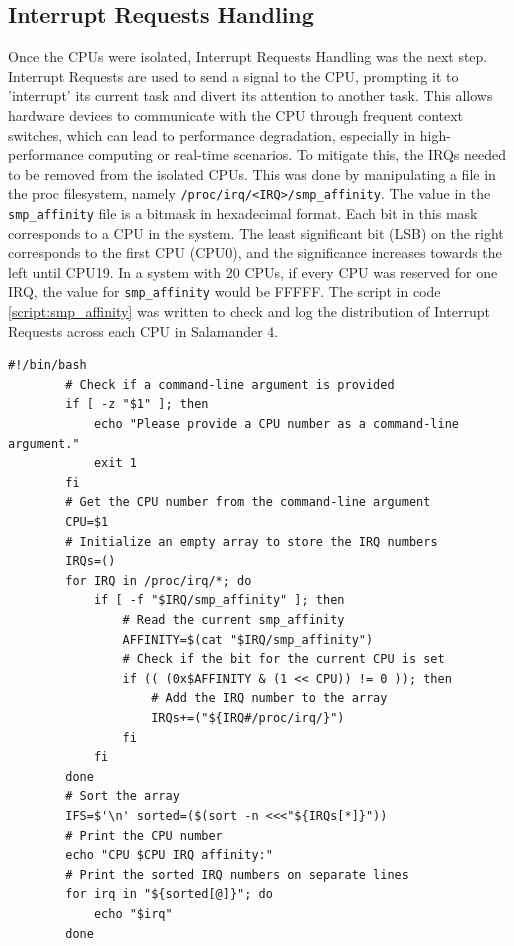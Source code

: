 \documentclass[MMR,Master,english]{twbook}
\begin{document}
\clearpage

\subsection{Interrupt Requests Handling}\label{sec:irq_handling}
Once the CPUs were isolated, Interrupt Requests Handling was the next step. Interrupt Requests are used to send a signal to the CPU, prompting it to 'interrupt' its current task and divert its attention to another task. This allows hardware devices to communicate with the CPU through frequent context switches, which can lead to performance degradation, especially in high-performance computing or real-time scenarios. To mitigate this, the IRQs needed to be removed from the isolated CPUs. This was done by manipulating a file in the proc filesystem, namely \texttt{/proc/irq/<IRQ>/smp\_affinity}. The value in the \texttt{smp\_affinity} file is a bitmask in hexadecimal format. Each bit in this mask corresponds to a CPU in the system. The least significant bit (LSB) on the right corresponds to the first CPU (CPU0), and the significance increases towards the left until CPU19. In a system with 20 CPUs, if every CPU was reserved for one IRQ, the value for \texttt{smp\_affinity} would be FFFFF. The script in code \ref{script:smp_affinity} was written to check and log the distribution of Interrupt Requests across each CPU in Salamander 4.

\vspace{1em}
\begin{minipage}{0.95\columnwidth}
	\begin{lstlisting}[name={Check distribution of Interrupt Requests across each CPU},label={script:smp_affinity}]
		#!/bin/bash
		# Check if a command-line argument is provided
		if [ -z "$1" ]; then
			echo "Please provide a CPU number as a command-line argument."
			exit 1
		fi
		# Get the CPU number from the command-line argument
		CPU=$1
		# Initialize an empty array to store the IRQ numbers
		IRQs=()
		for IRQ in /proc/irq/*; do
			if [ -f "$IRQ/smp_affinity" ]; then
				# Read the current smp_affinity
				AFFINITY=$(cat "$IRQ/smp_affinity")
				# Check if the bit for the current CPU is set
				if (( (0x$AFFINITY & (1 << CPU)) != 0 )); then
					# Add the IRQ number to the array
					IRQs+=("${IRQ#/proc/irq/}")
				fi
			fi
		done
		# Sort the array
		IFS=$'\n' sorted=($(sort -n <<<"${IRQs[*]}"))
		# Print the CPU number
		echo "CPU $CPU IRQ affinity:"
		# Print the sorted IRQ numbers on separate lines
		for irq in "${sorted[@]}"; do
			echo "$irq"
		done
		
\end{lstlisting}
\end{minipage}
\end{document}
